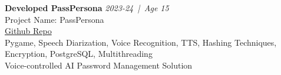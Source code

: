 \documentclass[a4paper,9pt]{extarticle}
\newcommand{\entryheader}[3]{%
    \noindent\textbf{#1} \hfill \textit{#2 \,|\, Age #3}
}
\begin{document}
    \noindent
    \entryheader{Developed PassPersona}{2023-24}{15} \\
    Project Name: PassPersona \\
    \href{https://github.com/godCoderXYZ/passwordManager}{Github Repo} \\
    Pygame, Speech Diarization, Voice Recognition, TTS, Hashing Techniques, Encryption, PostgreSQL, Multithreading \\
    Voice-controlled AI Password Management Solution \\
\end{document}
